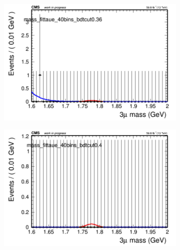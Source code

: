 \begin{figure}[H]
\begin{subfigure}{0.2\textwidth}
        \caption{}
    \end{subfigure}
    \begin{subfigure}{0.2\textwidth}
        \includegraphics[width=\textwidth]{unfixed_exp/plots/taue/massfit_taue_40bins_bdtcut0.36.png}
        \caption{}
    \end{subfigure}
    \begin{subfigure}{0.2\textwidth}
        \includegraphics[width=\textwidth]{unfixed_exp/plots/taue/massfit_taue_40bins_bdtcut0.4.png}
        \caption{}
    \end{subfigure}
    \begin{subfigure}{0.2\textwidth}

\end{subfigure}
\end{figure}
